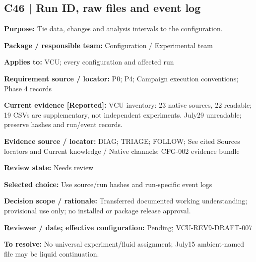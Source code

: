 \documentclass[11pt]{article}
\begin{document}
\par\noindent\begin{minipage}{\textwidth}\small\setlength{\parskip}{2pt}
\subsection*{C46 | Run ID, raw files and event log}
\textbf{Purpose:} Tie data, changes and analysis intervals to the configuration.\par
\textbf{Package / responsible team:} Configuration / Experimental team\par
\textbf{Applies to:} VCU; every configuration and affected run\par
\textbf{Requirement source / locator:} P0; P4; Campaign execution conventions; Phase 4 records\par
\textbf{Current evidence [Reported]:} VCU inventory: 23 native sources, 22 readable; 19 CSVs are supplementary, not independent experiments. July29 unreadable; preserve hashes and run/event records.\par
\textbf{Evidence source / locator:} DIAG; TRIAGE; FOLLOW; See cited Sources locators and Current knowledge / Native channels; CFG-002 evidence bundle\par
\textbf{Review state:} Needs review\par
\textbf{Selected choice:} Use source/run hashes and run-specific event logs\par
\textbf{Decision scope / rationale:} Transferred documented working understanding; provisional use only; no installed or package release approval.\par
\textbf{Reviewer / date; effective configuration:} Pending; VCU-REV9-DRAFT-007\par
\textbf{To resolve:} No universal experiment/fluid assignment; July15 ambient-named file may be liquid continuation.\par
\end{minipage}\par\vspace{5pt}
\end{document}
